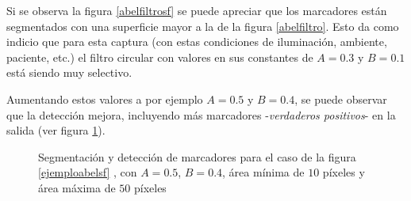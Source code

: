 Si se observa la figura \ref{abelfiltrosf} se puede apreciar que los marcadores están segmentados con una superficie mayor a la de la figura \ref{abelfiltro}.  Esto da como indicio que para esta captura (con estas condiciones de iluminación, ambiente, paciente, etc.) el filtro circular con valores en sus constantes de $A=0.3$ y $B=0.1$ está siendo muy selectivo.

Aumentando estos valores a por ejemplo $A=0.5$ y $B=0.4$, se puede observar que la detección mejora, incluyendo más marcadores -\textit{verdaderos positivos}- en la salida (ver figura \ref{ejemploabel2}).

\begin{figure}[H]
        \centering
        \hspace{5 mm}
  \caption{Segmentación y detección de marcadores para el caso de la figura \ref{ejemploabelsf} , con $A=0.5$, $B=0.4$, área mínima de $10$ píxeles y área máxima de $50$ píxeles}
      \label{ejemploabel2}
\end{figure}

